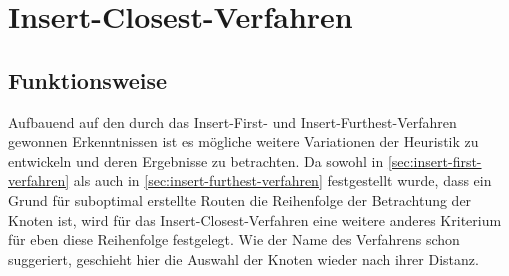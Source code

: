 \section{Insert-Closest-Verfahren}
    \subsection{Funktionsweise}
Aufbauend auf den durch das Insert-First- und Insert-Furthest-Verfahren gewonnen Erkenntnissen ist es mögliche weitere Variationen der Heuristik zu entwickeln und deren Ergebnisse zu betrachten.
Da sowohl in \vref{sec:insert-first-verfahren} als auch in \vref{sec:insert-furthest-verfahren} festgestellt wurde, dass ein Grund für suboptimal erstellte Routen die Reihenfolge der Betrachtung der Knoten ist, wird für das Insert-Closest-Verfahren eine weitere anderes Kriterium für eben diese Reihenfolge festgelegt.
Wie der Name des Verfahrens schon suggeriert, geschieht hier die Auswahl der Knoten wieder nach ihrer Distanz.


